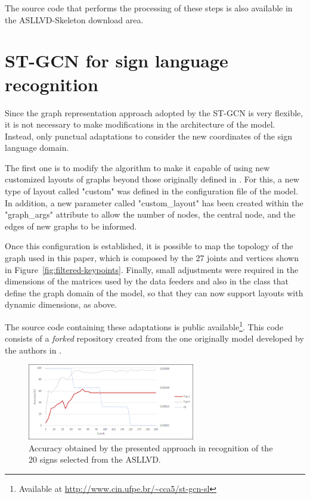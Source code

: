 The source code that performs the processing of these steps is also available in the ASLLVD-Skeleton download area.


\section{ST-GCN for sign language recognition} 
\label{sec:st-gcn-for-sl-recognition}

Since the graph representation approach adopted by the ST-GCN is very flexible, it is not necessary to make modifications in the architecture of the model. Instead, only punctual adaptations to consider the new coordinates of the sign language domain.

The first one is to modify the algorithm to make it capable of using new customized layouts of graphs beyond those originally defined in \cite{st-gcn-2018}. For this, a new type of layout called "custom" was defined in the configuration file of the model. In addition, a new parameter called "custom\_layout" has been created within the "graph\_args" attribute to allow the number of nodes, the central node, and the edges of new graphs to be informed.

Once this configuration is established, it is possible to map the topology of the graph used in this paper, which is composed by the 27 joints and vertices shown in  Figure~\ref{fig:filtered-keypoints}. Finally, small adjustments were required in the dimensions of the matrices used by the data feeders and also in the class that define the graph domain of the model, so that they can now support layouts with dynamic dimensions, as above.

The source code containing these adaptations is public available\footnote{
    Available at \url{http://www.cin.ufpe.br/~cca5/st-gcn-sl}
}. This code consists of a \textit{forked} repository created from the one originally model developed by the authors in \cite{st-gcn-2018}.


\begin{figure}[!t]
    \centering
    \includegraphics[width=0.65\textwidth]{images/results_20}
    \caption{Accuracy obtained by the presented approach in recognition of the 20 signs selected from the ASLLVD.}
    \label{fig:training-asllvd-20}
\end{figure}


